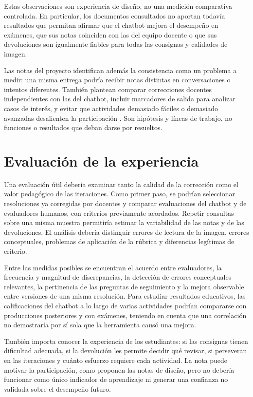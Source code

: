 \documentclass[11pt,a4paper]{article}
\begin{document}
Estas observaciones son experiencia de diseño, no una medición comparativa controlada. En particular, los documentos consultados no aportan todavía resultados que permitan afirmar que el chatbot mejora el desempeño en exámenes, que sus notas coinciden con las del equipo docente o que sus devoluciones son igualmente fiables para todas las consignas y calidades de imagen.

Las notas del proyecto identifican además la consistencia como un problema a medir: una misma entrega podría recibir notas distintas en conversaciones o intentos diferentes. También plantean comparar correcciones docentes independientes con las del chatbot, incluir marcadores de salida para analizar casos de interés, y evitar que actividades demasiado fáciles o demasiado avanzadas desalienten la participación \cite{notas}. Son hipótesis y líneas de trabajo, no funciones o resultados que deban darse por resueltos.

\section{Evaluación de la experiencia}

Una evaluación útil debería examinar tanto la calidad de la corrección como el valor pedagógico de las iteraciones. Como primer paso, se podrían seleccionar resoluciones ya corregidas por docentes y comparar evaluaciones del chatbot y de evaluadores humanos, con criterios previamente acordados. Repetir consultas sobre una misma muestra permitiría estimar la variabilidad de las notas y de las devoluciones. El análisis debería distinguir errores de lectura de la imagen, errores conceptuales, problemas de aplicación de la rúbrica y diferencias legítimas de criterio.

Entre las medidas posibles se encuentran el acuerdo entre evaluadores, la frecuencia y magnitud de discrepancias, la detección de errores conceptuales relevantes, la pertinencia de las preguntas de seguimiento y la mejora observable entre versiones de una misma resolución. Para estudiar resultados educativos, las calificaciones del chatbot a lo largo de varias actividades podrían compararse con producciones posteriores y con exámenes, teniendo en cuenta que una correlación no demostraría por sí sola que la herramienta causó una mejora.

También importa conocer la experiencia de los estudiantes: si las consignas tienen dificultad adecuada, si la devolución les permite decidir qué revisar, si perseveran en las iteraciones y cuánto esfuerzo requiere cada actividad. La nota puede motivar la participación, como proponen las notas de diseño, pero no debería funcionar como único indicador de aprendizaje ni generar una confianza no validada sobre el desempeño futuro.
\end{document}
